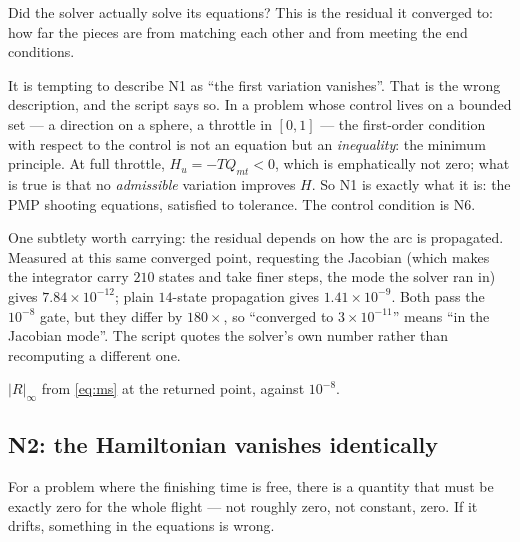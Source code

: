 \documentclass[11pt]{article}
\newcommand{\Qmt}{Q_{mt}}
\begin{document}
\begin{eli}
Did the solver actually solve its equations? This is the residual it converged
to: how far the pieces are from matching each other and from meeting the end
conditions.
\end{eli}

\begin{intu}
It is tempting to describe N1 as ``the first variation vanishes''. That is the
wrong description, and the script says so. In a problem whose control lives on
a bounded set --- a direction on a sphere, a throttle in $[0,1]$ --- the
first-order condition with respect to the control is not an equation but an
\emph{inequality}: the minimum principle. At full throttle, $H_u = -T\Qmt < 0$,
which is emphatically not zero; what is true is that no \emph{admissible}
variation improves $H$. So N1 is exactly what it is: the PMP shooting
equations, satisfied to tolerance. The control condition is N6.

One subtlety worth carrying: the residual depends on how the arc is propagated.
Measured at this same converged point, requesting the Jacobian (which makes the
integrator carry $210$ states and take finer steps, the mode the solver ran in)
gives $7.84\times10^{-12}$; plain $14$-state propagation gives
$1.41\times10^{-9}$. Both pass the $10^{-8}$ gate, but they differ by $180\times$,
so ``converged to $3\times10^{-11}$'' means ``in the Jacobian mode''. The script
quotes the solver's own number rather than recomputing a different one.
\end{intu}

\begin{rig}
$|R|_\infty$ from \eqref{eq:ms} at the returned point, against $10^{-8}$.
\end{rig}

\subsection{N2: the Hamiltonian vanishes identically}\label{sec:N2}

\begin{eli}
For a problem where the finishing time is free, there is a quantity that must
be exactly zero for the whole flight --- not roughly zero, not constant, zero.
If it drifts, something in the equations is wrong.
\end{eli}
\end{document}

